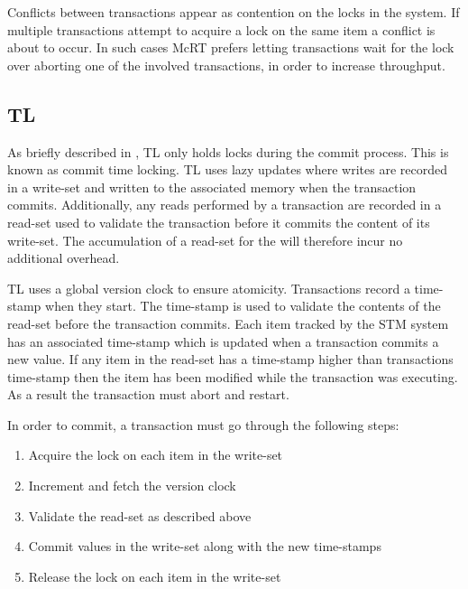 Conflicts between transactions appear as contention on the locks in the system. If multiple transactions attempt to acquire a lock on the same item a conflict is about to occur. In such cases McRT prefers letting transactions wait for the lock over aborting one of the involved transactions, in order to increase throughput\cite[p. 189]{saha2006mcrt}.

\subsection{TL}
\label{sec:stm_impl_tl2}
As briefly described in , TL only holds locks during the commit process\cite[p. 199]{dice2006transactional}. This is known as commit time locking. TL uses lazy updates where writes are recorded in a write-set and written to the associated memory when the transaction commits. Additionally, any reads performed by a transaction are recorded in a read-set used to validate the transaction before it commits the content of its write-set\cite[p. 198]{dice2006transactional}. The accumulation of a read-set for the  will therefore incur no additional overhead.

TL uses a global version clock to ensure atomicity\cite[p. 201]{dice2006transactional}. Transactions record a time-stamp when they start. The time-stamp is used to validate the contents of the read-set before the transaction commits. Each item tracked by the \ac{STM} system has an associated time-stamp which is updated when a transaction commits a new value. If any item in the read-set has a time-stamp higher than transactions time-stamp then the item has been modified while the transaction was executing. As a result the transaction must abort and restart.

In order to commit, a transaction must go through the following steps\cite[p. 200]{dice2006transactional}:
\begin{enumerate}
\item Acquire the lock on each item in the write-set
\item Increment and fetch the version clock
\item Validate the read-set as described above
\item Commit values in the write-set along with the new time-stamps
\item Release the lock on each item in the write-set
\end{enumerate}

